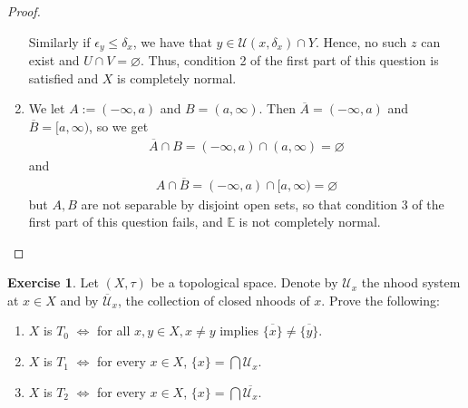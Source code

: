 \documentclass[12pt]{extarticle}
\newcommand{\set}[1]{\{#1\}}
\newcommand{\<}{\langle}
\renewcommand{\>}{\rangle}
\renewcommand{\emptyset}{\varnothing}
\theoremstyle{definition}
\newtheorem{exercise}{Exercise}
\begin{document}
\begin{proof}
\begin{enumerate}
    Similarly if $ \epsilon_y \leq \delta_x$, we have that $y \in \mathcal{U}(x, \delta_x) \cap Y$. Hence, no such $z$ can exist and $U \cap V = \emptyset$. Thus, condition 2 of the first part of this question is satisfied and $X$ is completely normal.
  \item
    We let $A := (- \infty, a)$ and $B = (a, \infty)$. Then $\overline{A} = (- \infty, a) $ and $\overline{B} = [a, \infty)$, so we get 
    \begin{align*}
      \overline{A} \cap B = (- \infty, a) \cap (a, \infty) = \emptyset
    \end{align*}
    and 
    \begin{align*}
      A \cap \overline{B} = (- \infty, a) \cap [a, \infty) = \emptyset
    \end{align*}
    but $A, B$ are not separable by disjoint open sets, so that condition 3 of the first part of this question fails, and $\mathbb{E}$ is not completely normal. 
  \end{enumerate}
\end{proof}
\begin{exercise}
  Let $(X, \tau)$ be a topological space. Denote by $\mathcal{U}_x$ the nhood system at $x \in X$ and by $\overline{\mathcal{U}}_x$,
  the collection of closed nhoods of $x$. Prove the following:
  \begin{enumerate}
  \item
    $X$ is $T_0$ $\iff$ for all $x, y \in X, x \neq y$ implies $\overline{\set{x}} \neq \overline{\set{y}}$.
  \item
    $X$ is $T_1$ $\iff$ for every $x \in X$, $\set{x} = \bigcap \mathcal{U}_x$.
  \item
    $X$ is $T_2$ $\iff$ for every $x \in X$, $\set{x} = \bigcap \overline{\mathcal{U}_x}$.
  \end{enumerate}
\end{exercise}
\end{document}
